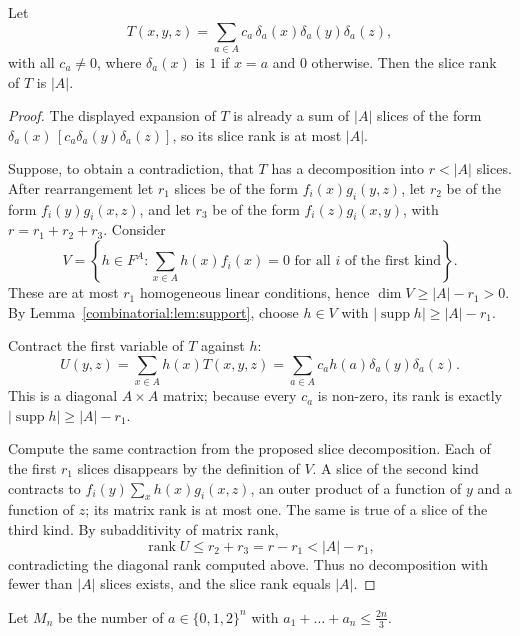 \begin{lemma}[Tao, 2016]\label{combinatorial:lem:diag}
Let
\[
T(x,y,z)=\sum_{a\in A}c_a\,\delta_a(x)\delta_a(y)\delta_a(z),
\]
with all $c_a\ne0$, where $\delta_a(x)$ is $1$ if $x=a$ and $0$ otherwise. Then the slice rank of $T$ is $|A|$.
\end{lemma}
\begin{proof}
The displayed expansion of $T$ is already a sum
of $|A|$ slices of the form
$\delta_a(x)\,[c_a\delta_a(y)\delta_a(z)]$,
so its slice rank is at most $|A|$.

Suppose, to obtain a contradiction, that $T$
has a decomposition into $r<|A|$ slices.
After rearrangement let $r_1$ slices be of
the form $f_i(x)g_i(y,z)$, let $r_2$ be of
the form $f_i(y)g_i(x,z)$, and let $r_3$
be of the form $f_i(z)g_i(x,y)$, with
$r=r_1+r_2+r_3$. Consider
\[
V=\left\{h\in F^A:
 \sum_{x\in A}h(x)f_i(x)=0
 \text{ for all }i\text{ of the first kind}\right\}.
\]
These are at most $r_1$ homogeneous linear
conditions, hence $\dim V\ge|A|-r_1>0$.
By Lemma~\ref{combinatorial:lem:support},
choose $h\in V$ with
$|\operatorname{supp}h|\ge|A|-r_1$.

Contract the first variable of $T$ against $h$:
\[
U(y,z)=\sum_{x\in A}h(x)T(x,y,z)
=\sum_{a\in A}c_ah(a)\delta_a(y)\delta_a(z).
\]
This is a diagonal $A\times A$ matrix; because
every $c_a$ is non-zero, its rank is exactly
$|\operatorname{supp}h|\ge|A|-r_1$.

Compute the same contraction from the proposed
slice decomposition. Each of the first $r_1$
slices disappears by the definition of $V$.
A slice of the second kind contracts to
$f_i(y)\sum_xh(x)g_i(x,z)$, an outer product
of a function of $y$ and a function of $z$;
its matrix rank is at most one. The same is
true of a slice of the third kind. By
subadditivity of matrix rank,
\[
\operatorname{rank}U\le r_2+r_3
=r-r_1<|A|-r_1,
\]
contradicting the diagonal rank computed above.
Thus no decomposition with fewer than $|A|$
slices exists, and the slice rank equals $|A|$.
\end{proof}

Let $M_n$ be the number of $a\in\{0,1,2\}^n$ with $a_1+\dots+a_n\le\frac{2n}3$.


